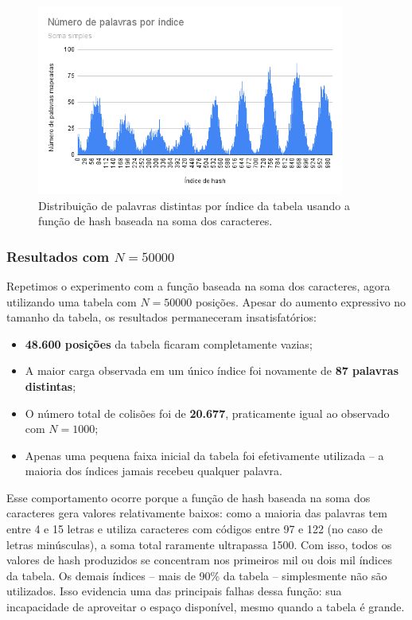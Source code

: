 \begin{figure}[h]
\centering
\includegraphics[width=0.9\textwidth]{soma_simples.png}
\caption{Distribuição de palavras distintas por índice da tabela usando a função de hash baseada na soma dos caracteres.}
\end{figure}

\subsubsection*{Resultados com $N = 50000$}

Repetimos o experimento com a função baseada na soma dos caracteres, agora utilizando uma tabela com $N = 50000$ posições. 
Apesar do aumento expressivo no tamanho da tabela, os resultados permaneceram insatisfatórios:

\begin{itemize}
  \item \textbf{48.600 posições} da tabela ficaram completamente vazias;
  \item A maior carga observada em um único índice foi novamente de \textbf{87 palavras distintas};
  \item O número total de colisões foi de \textbf{20.677}, praticamente igual ao observado com $N = 1000$;
  \item Apenas uma pequena faixa inicial da tabela foi efetivamente utilizada -- a maioria dos índices jamais recebeu qualquer palavra.
\end{itemize}

Esse comportamento ocorre porque a função de hash baseada na soma dos caracteres gera valores relativamente baixos: como a maioria das palavras tem entre 4 e 15 letras e utiliza caracteres com códigos entre 97 e 122 (no caso de letras minúsculas), a soma total raramente ultrapassa 1500. 
Com isso, todos os valores de hash produzidos se concentram nos primeiros mil ou dois mil índices da tabela. 
Os demais índices -- mais de 90\% da tabela -- simplesmente não são utilizados. 
Isso evidencia uma das principais falhas dessa função: sua incapacidade de aproveitar o espaço disponível, mesmo quando a tabela é grande.



